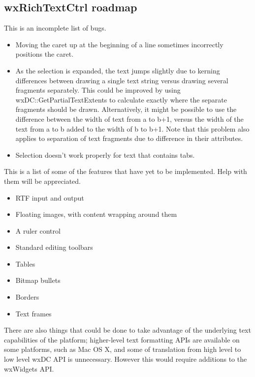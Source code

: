 \subsection{wxRichTextCtrl roadmap}


This is an incomplete list of bugs.

\begin{itemize}\itemsep=0pt
\item Moving the caret up at the beginning of a line sometimes incorrectly positions the
caret.
\item As the selection is expanded, the text jumps slightly due to kerning differences between
drawing a single text string versus drawing several fragments separately. This could
be improved by using wxDC::GetPartialTextExtents to calculate exactly where the separate fragments
should be drawn.
Alternatively, it might be possible to use the difference between the width of text from
a to b+1, versus the width of the text from a to b added to the width of b to b+1.
Note that this problem also applies to separation of text fragments due to difference in their attributes.
\item Selection doesn't work properly for text that contains tabs.
\end{itemize}


This is a list of some of the features that have yet to be implemented. Help with them will be appreciated.

\begin{itemize}\itemsep=0pt
\item RTF input and output
\item Floating images, with content wrapping around them
\item A ruler control
\item Standard editing toolbars
\item Tables
\item Bitmap bullets
\item Borders
\item Text frames
\end{itemize}

There are also things that could be done to take advantage of the underlying text capabilities of the platform;
higher-level text formatting APIs are available on some platforms, such as Mac OS X, and some of translation from
high level to low level wxDC API is unnecessary. However this would require additions to the wxWidgets API.


